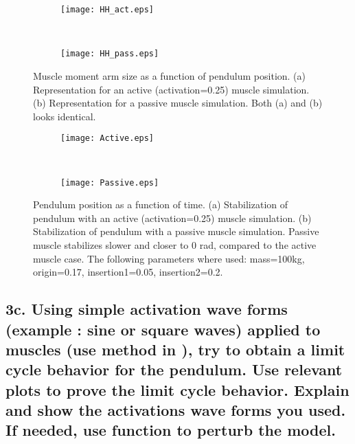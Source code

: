 \documentclass{cmc}
\begin{document}
\begin{figure}[ht!]
    \centering
    \begin{subfigure}[t]{0.5\textwidth}
        \centering
        \texttt{[image: HH\_act.eps]}
        \caption{}
    \end{subfigure}%
    ~ 
    \begin{subfigure}[t]{0.5\textwidth}
        \centering
        \texttt{[image: HH\_pass.eps]}
        \caption{}
    \end{subfigure}
    \caption{Muscle moment arm size as a function of pendulum position. (a) Representation for an active (activation=0.25) muscle simulation. (b) Representation for a passive muscle simulation. Both (a) and (b) looks identical.}
    \label{figure:HH}
\end{figure}

\begin{figure}[ht!]
    \centering
    \begin{subfigure}[t]{0.5\textwidth}
        \centering
        \texttt{[image: Active.eps]}
        \caption{}
    \end{subfigure}%
    ~ 
    \begin{subfigure}[t]{0.5\textwidth}
        \centering
        \texttt{[image: Passive.eps]}
        \caption{}
    \end{subfigure}
    \caption{Pendulum position as a function of time. (a) Stabilization of pendulum with an active (activation=0.25) muscle simulation. (b) Stabilization of pendulum with a passive muscle simulation. Passive muscle stabilizes slower and closer to 0 rad, compared to the active muscle case. The following parameters where used: mass=100kg, origin=0.17, insertion1=0.05, insertion2=0.2.}
    \label{figure:activepassive}
\end{figure}

\clearpage
\subsection*{3c. Using simple activation wave forms (example : sine or
  square waves) applied to muscles (use
   method in
  ), try to obtain a limit cycle behavior for
  the pendulum. Use relevant plots to prove the limit cycle behavior.
  Explain and show the activations wave forms you used. If needed, use
   function to
  perturb the model.}
\label{sec:3c}
\end{document}
